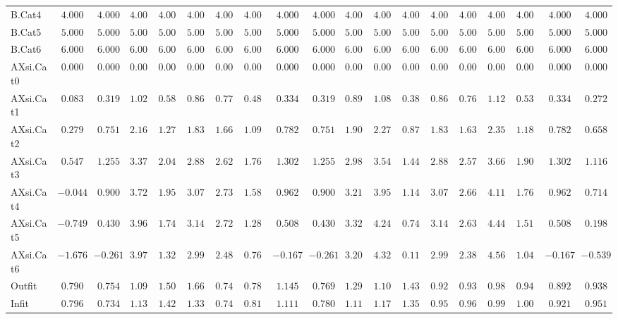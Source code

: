 \documentclass[6pt]{article}
\begin{document}
{\begin{longtable}{lrrrrrrrrrrrrrrrrrr}
B.Cat4&$ 4.000$&$ 4.000$&$ 4.000$&$ 4.000$&$ 4.000$&$ 4.000$&$ 4.000$&$ 4.000$&$ 4.000$&$ 4.000$&$ 4.000$&$ 4.000$&$ 4.000$&$ 4.000$&$ 4.000$&$ 4.000$&$ 4.000$&$ 4.000$\tabularnewline
B.Cat5&$ 5.000$&$ 5.000$&$ 5.000$&$ 5.000$&$ 5.000$&$ 5.000$&$ 5.000$&$ 5.000$&$ 5.000$&$ 5.000$&$ 5.000$&$ 5.000$&$ 5.000$&$ 5.000$&$ 5.000$&$ 5.000$&$ 5.000$&$ 5.000$\tabularnewline
B.Cat6&$ 6.000$&$ 6.000$&$ 6.000$&$ 6.000$&$ 6.000$&$ 6.000$&$ 6.000$&$ 6.000$&$ 6.000$&$ 6.000$&$ 6.000$&$ 6.000$&$ 6.000$&$ 6.000$&$ 6.000$&$ 6.000$&$ 6.000$&$ 6.000$\tabularnewline
AXsi.Cat0&$ 0.000$&$ 0.000$&$ 0.000$&$ 0.000$&$ 0.000$&$ 0.000$&$ 0.000$&$ 0.000$&$ 0.000$&$ 0.000$&$ 0.000$&$ 0.000$&$ 0.000$&$ 0.000$&$ 0.000$&$ 0.000$&$ 0.000$&$ 0.000$\tabularnewline
AXsi.Cat1&$ 0.083$&$ 0.319$&$ 1.024$&$ 0.582$&$ 0.862$&$ 0.776$&$ 0.489$&$ 0.334$&$ 0.319$&$ 0.897$&$ 1.082$&$ 0.380$&$ 0.862$&$ 0.760$&$ 1.122$&$ 0.535$&$ 0.334$&$ 0.272$\tabularnewline
AXsi.Cat2&$ 0.279$&$ 0.751$&$ 2.162$&$ 1.278$&$ 1.836$&$ 1.666$&$ 1.091$&$ 0.782$&$ 0.751$&$ 1.906$&$ 2.278$&$ 0.874$&$ 1.836$&$ 1.632$&$ 2.358$&$ 1.184$&$ 0.782$&$ 0.658$\tabularnewline
AXsi.Cat3&$ 0.547$&$ 1.255$&$ 3.373$&$ 2.046$&$ 2.884$&$ 2.629$&$ 1.765$&$ 1.302$&$ 1.255$&$ 2.989$&$ 3.546$&$ 1.441$&$ 2.884$&$ 2.578$&$ 3.666$&$ 1.905$&$ 1.302$&$ 1.116$\tabularnewline
AXsi.Cat4&$-0.044$&$ 0.900$&$ 3.723$&$ 1.954$&$ 3.072$&$ 2.731$&$ 1.580$&$ 0.962$&$ 0.900$&$ 3.212$&$ 3.955$&$ 1.147$&$ 3.072$&$ 2.664$&$ 4.115$&$ 1.767$&$ 0.962$&$ 0.714$\tabularnewline
AXsi.Cat5&$-0.749$&$ 0.430$&$ 3.960$&$ 1.748$&$ 3.145$&$ 2.720$&$ 1.281$&$ 0.508$&$ 0.430$&$ 3.320$&$ 4.249$&$ 0.740$&$ 3.145$&$ 2.635$&$ 4.449$&$ 1.514$&$ 0.508$&$ 0.198$\tabularnewline
AXsi.Cat6&$-1.676$&$-0.261$&$ 3.975$&$ 1.321$&$ 2.997$&$ 2.487$&$ 0.760$&$-0.167$&$-0.261$&$ 3.207$&$ 4.322$&$ 0.110$&$ 2.997$&$ 2.385$&$ 4.562$&$ 1.040$&$-0.167$&$-0.539$\tabularnewline
Outfit&$ 0.790$&$ 0.754$&$ 1.090$&$ 1.507$&$ 1.665$&$ 0.749$&$ 0.789$&$ 1.145$&$ 0.769$&$ 1.291$&$ 1.109$&$ 1.437$&$ 0.925$&$ 0.936$&$ 0.981$&$ 0.944$&$ 0.892$&$ 0.938$\tabularnewline
Infit&$ 0.796$&$ 0.734$&$ 1.131$&$ 1.429$&$ 1.331$&$ 0.745$&$ 0.819$&$ 1.111$&$ 0.780$&$ 1.117$&$ 1.179$&$ 1.353$&$ 0.955$&$ 0.962$&$ 0.995$&$ 1.008$&$ 0.921$&$ 0.951$\tabularnewline
\hline
\end{longtable}}
\end{document}
